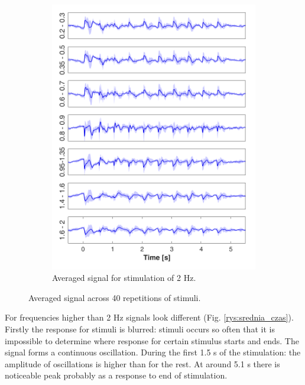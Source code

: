 \documentclass{pracalicmgr}
\begin{document}
\begin{figure}[H]
\begin{subfigure}{.5\textwidth}
		\includegraphics[width=1.\linewidth]{srednie_2Hz_5s.png}
		\caption{Averaged signal for stimulation of 2 Hz.}
		\label{rys:srednie_2Hz}
	\end{subfigure}
	\caption{Averaged signal across 40 repetitions of stimuli.}
	\label{rys:srednie_1_2}
	\end{figure}
    
    For frequencies higher than 2 Hz signals look different (Fig. \ref{rys:srednia_czas}). Firstly the response for stimuli is blurred: stimuli occurs so often that it is impossible to determine where response for certain stimulus starts and ends. The signal forms a continuous oscillation. During the first 1.5 s of the stimulation: the amplitude of oscillations is higher than for the rest. At around 5.1 s there is noticeable peak probably as a response to end of stimulation. 
    
\end{document}
